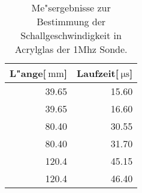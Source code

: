 
\begin{table}[!h]
\begin{center}
\begin{tabular}{|r|r|}
\hline
 L"ange[$\SI{}{\milli\meter}$] & Laufzeit[$\SI{}{\micro\second}$]\\
\hline
\hline
39.65 &	15.60\\
39.65 &	16.60\\
80.40 &	30.55\\
80.40 &	31.70\\
120.4 &	45.15\\
120.4 &	46.40\\
\hline
\end{tabular}
\caption[]{Me"sergebnisse zur Bestimmung der Schallgeschwindigkeit in Acrylglas der 1Mhz Sonde.}
\label{a1}
\end{center}
\end{table}